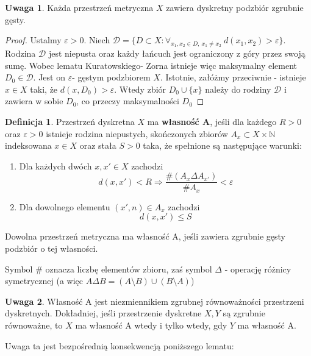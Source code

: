 \documentclass[licencjacka]{pracamgr}
\theoremstyle{definition}
\newtheorem{definition}{Definicja}[section]
\theoremstyle{definition}
\newtheorem{remark}{Uwaga}[section]
\theoremstyle{definition}
\theoremstyle{definition}
\theoremstyle{definition}
\theoremstyle{plain}
\theoremstyle{plain}
\begin{document}
\begin{remark}
	Każda przestrzeń metryczna $ X $ zawiera dyskretny podzbiór zgrubnie gęsty.
\end{remark}
\begin{proof}
	Ustalmy $ \varepsilon > 0 $. Niech $ \mathcal{D} = \{D \subset X : \forall_{x_1, x_2 \in D, ~
	x_1 \neq x_2} ~ d(x_1, x_2) > \varepsilon \} $. Rodzina $ \mathcal{D} $ jest niepusta 
	oraz każdy łańcuch jest ograniczony z góry przez swoją sumę. Wobec lematu Kuratowskiego-
	Zorna istnieje więc maksymalny element $D_0 \in \mathcal{D}$. Jest on $ \varepsilon $-
	gęstym podzbiorem $ X $. Istotnie, załóżmy przeciwnie - istnieje $ x \in X $ taki, że 
	$ d(x, D_0) > \varepsilon $. Wtedy zbiór $ D_0 \cup \{x\} $ należy do rodziny 
	$ \mathcal{D} $ i zawiera w sobie $ D_0 $, co przeczy maksymalności $ D_0 $
\end{proof}

\begin{definition}
	Przestrzeń dyskretna $ X $ ma \textbf{własność A}, jeśli dla każdego $ R>0 $ oraz 
	$ \varepsilon > 0 $ istnieje rodzina niepustych, skończonych zbiorów $ A_x \subset 
	X \times \mathbb{N} $ indeksowana $ x \in X $ oraz stała $ S > 0 $ taka, że 
	spełnione są następujące warunki:
	\begin{enumerate}
		\item Dla każdych dwóch $ x,x' \in X $ zachodzi
		$$ d(x,x') < R \Rightarrow \frac{\# (A_x \Delta A_{x'})}{\# A_x} < \varepsilon$$
		\item Dla dowolnego elementu $(x', n) \in A_x$ zachodzi $$ d(x,x') \leq S $$
	\end{enumerate}
	Dowolna przestrzeń metryczna ma własność A, jeśli zawiera zgrubnie gęsty podzbiór 
	o tej własności.
\end{definition}
Symbol $ \# $ oznacza liczbę elementów zbioru, zaś symbol $ \Delta $ - operację 
różnicy symetrycznej (a więc $A \Delta B = (A \setminus B) \cup (B \setminus A)$)


\begin{remark}
	Własność A jest niezmiennikiem zgrubnej równoważności przestrzeni dyskretnych. 
	Dokładniej, jeśli przestrzenie dyskretne $ X,Y $ są zgrubnie równoważne, to 
	$ X $ ma własność A wtedy i tylko wtedy, gdy $ Y $ ma własność A.
\end{remark}

Uwaga ta jest bezpośrednią konsekwencją poniższego lematu:
\end{document}
